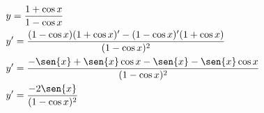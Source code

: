 \begin{ex}
\begin{align}
&y=\frac{1+\cos{x}}{1-\cos{x}}\nonumber\\
&y'=\frac{(1-\cos{x})(1+\cos{x})'-(1-\cos{x})'(1+\cos{x})}{(1-\cos{x})^2}\nonumber\\
&y'=\frac{-\sen{x}+\sen{x}\cos{x}-\sen{x}-\sen{x}\cos{x}}{(1-\cos{x})^2}\nonumber\\
&y'=\frac{-2\sen{x}}{(1-\cos{x})^2}\nonumber
\end{align}
\end{ex}